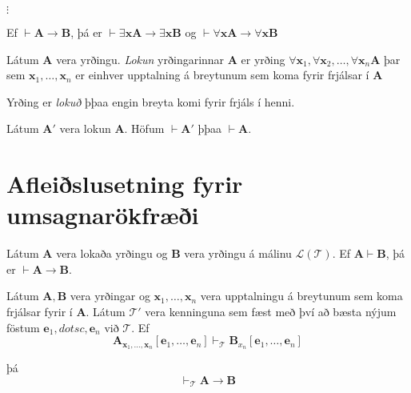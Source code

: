 \documentclass[12pt]{book}
\begin{document}
$\vdots$



\begin{setn}[Fylgisetning]
  Ef $\vdash \mathbf{A} \rightarrow \mathbf{B}$, þá er
  $ \vdash \exists \mathbf{x} \mathbf{A} \rightarrow   \exists \mathbf{x} \mathbf{B}$
  og $\vdash \forall \mathbf{x}\mathbf{A} \rightarrow \forall \mathbf{x} \mathbf{B}$
\end{setn}


\begin{skgr}
  Látum $\mathbf{A}$ vera yrðingu. \emph{Lokun} yrðingarinnar
  $\mathbf{A}$ er yrðing $\forall \mathbf{x}_1, \forall \mathbf{x}_2, \dotsc,
  \forall \mathbf{x}_n \mathbf{A}$ þar sem $\mathbf{x}_1, \dotsc, \mathbf{x}_n$
er einhver upptalning á breytunum sem koma fyrir frjálsar í $\mathbf{A}$
\end{skgr}

\begin{ath}
  Yrðing er \emph{lokuð} þþaa engin breyta komi fyrir frjáls í henni.
\end{ath}

\begin{setn}[Fylgisetn]
  Látum $\mathbf{A}'$ vera lokun $\mathbf{A}$. Höfum $\vdash \mathbf{A}'$
  þþaa $\vdash \mathbf{A}$.
\end{setn}

\section{Afleiðslusetning fyrir umsagnarökfræði}

Látum $\mathbf{A}$ vera lokaða yrðingu og $\mathbf{B}$ vera
yrðingu á málinu $\mathcal{L(T)}$.
Ef $\mathbf{A} \vdash \mathbf{B}$, þá er $\vdash \mathbf{A} \rightarrow \mathbf{B}$.



\begin{setn}[Fylgisetning]
  Látum $\mathbf{A}, \mathbf{B}$ vera yrðingar og $\mathbf{x}_1, \dotsc, \mathbf{x}_n$
vera upptalningu á breytunum sem koma frjálsar fyrir í $\mathbf{A}$. Látum $\mathcal{T}'$
vera  kenninguna sem fæst með því að bæsta nýjum föstum $\mathbf{e}_1, dotsc, \mathbf{e}_n$
við $\mathcal{T}$. Ef
\[
\mathbf{A}_{\mathbf{x}_1, \dotsc, \mathbf{x}_n}[\mathbf{e}_1, \dotsc, \mathbf{e}_n] \vdash_{\mathcal{T}}
\mathbf{B}_{x_n}[\mathbf{e}_1, \dotsc, \mathbf{e}_n]
\]

þá
\[ \vdash_{\mathcal{T}} \mathbf{A} \rightarrow \mathbf{B} \]



\end{setn}
\end{document}
